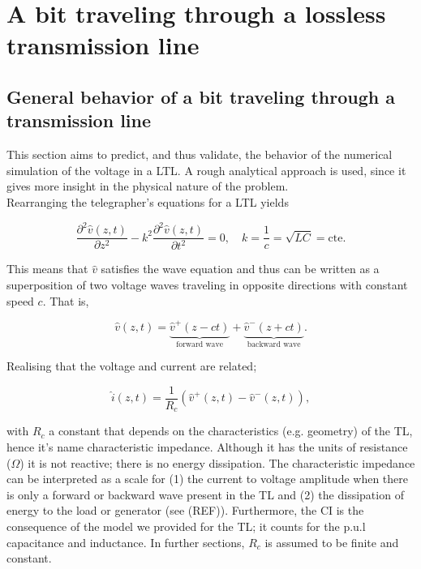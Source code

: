 \section{A bit traveling through a lossless transmission line}

\subsection{General behavior of a bit traveling through a transmission line}
This section aims to predict, and thus validate, the behavior of the numerical simulation of the voltage in a LTL. A rough analytical approach is used, since it gives more insight in the physical nature of the problem.  \\

Rearranging the telegrapher's equations for a LTL yields

\begin{equation}
\frac{\partial^2\hat{v}(z, t)}{\partial z^2} - k^2\frac{\partial^2 \hat{v}(z, t)}{\partial t^2} = 0, \quad k = \frac{1}{c}= \sqrt{LC} = \mathrm{cte}.
\label{tele}
\end{equation}

This means that $\hat{v}$ satisfies the wave equation and thus can be written as a superposition of two voltage waves traveling in opposite directions with constant speed $c$. That is,

\begin{equation}
\hat{v}(z, t) = \underbrace{\hat{v}^{+}(z - ct)}_{\text{forward wave}} + \underbrace{\hat{v}^{-}(z + ct)}_{\text{backward wave}}.
\end{equation}

Realising that the voltage and current are related;

\begin{equation}
\hat{i}(z, t) = \frac{1}{R_c}(\hat{v}^{+}(z, t) - \hat{v}^{-}(z, t)),
\end{equation}

with $R_c$ a constant that depends on the characteristics (e.g. geometry) of the TL, hence it's name characteristic impedance. Although it has the units of resistance ($\Omega$) it is not reactive; there is no energy dissipation. The characteristic impedance can be interpreted as a scale for (1) the current to voltage amplitude when there is only a forward or backward wave present in the TL and (2) the dissipation of energy to the load or generator (see (REF)). Furthermore, the CI is the consequence of the model we provided for the TL; it counts for the p.u.l capacitance and inductance. In further sections, $R_c$ is assumed to be finite and constant.


